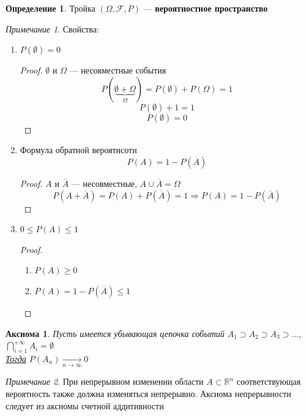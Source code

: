 \documentclass[oneside]{book}
\newcommand{\R}{\mathbb{R}}
\theoremstyle{plain}
\newtheorem{axiom}{Аксиома}
\theoremstyle{remark}
\newtheorem*{remark}{Примечание}
\theoremstyle{definition}
\newtheorem*{definition}{Определение}
\begin{document}
\begin{definition}
Тройка \((\Omega, \mathcal{F}, P)\) --- \textbf{вероятностное пространство}
\end{definition}
\begin{remark}
Свойства:
\begin{enumerate}
\item \(P(\emptyset) = 0\)
\begin{proof}
\(\emptyset\) и \(\Omega\) --- несовместные события
\[ P(\underbrace{\emptyset + \Omega}_\Omega) = P(\emptyset) + P(\Omega) = 1 \]
\[ P(\emptyset) + 1 = 1 \]
\[ P(\emptyset) = 0 \]
\end{proof}
\item Формула обратной вероятнсоти \[ P(A) = 1 - P(\overline{A}) \]
\begin{proof}
\(A\) и \(\overline{A}\) --- несовместные, \(A \cup \overline{A} = \Omega\)
\[ P(A + \overline{A}) = P(A) + P(\overline{A}) = 1 \Rightarrow P(A) = 1 - P(\overline{A}) \]
\end{proof}
\item \(0 \le P(A) \le 1\)
\begin{proof}
\-
\begin{enumerate}
\item \(P(A) \ge 0\)
\item \(P(A) = 1 - P(\overline{A}) \le 1\)
\end{enumerate}
\end{proof}
\end{enumerate}
\end{remark}
\begin{axiom}
Пусть имеется убывающая цепочка событий \(A_1 \supset A_2 \supset A_3 \supset \dots\), \(\bigcap_{i = 1}^{+ \infty} A_i = \emptyset\) \\
\uline{Тогда} \(P(A_n) \xrightarrow[n \to \infty]{} 0\)
\end{axiom}
\begin{remark}
При непрерывном изменении области \(A\subset \R^n\) соответствующая вероятность также должна изменяться непрерывно.
Аксиома непрерывности следует из аксиомы счетной аддитивности
\end{remark}
\end{document}
